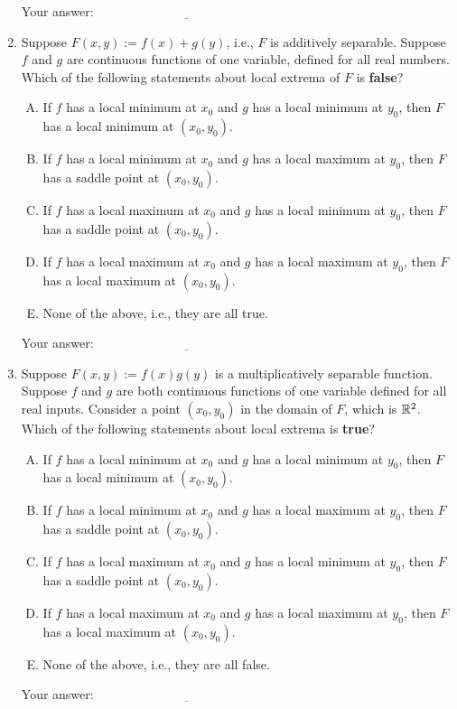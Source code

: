 \documentclass[10pt]{amsart}
\begin{document}
\begin{enumerate}
  \vspace{0.1in}
  Your answer: $\underline{\qquad\qquad\qquad\qquad\qquad\qquad\qquad}$
  \vspace{0.15in}

\item Suppose $F(x,y) := f(x) + g(y)$, i.e., $F$ is additively
  separable. Suppose $f$ and $g$ are continuous functions of one
  variable, defined for all real numbers. Which of the following
  statements about local extrema of $F$ is {\bf false}?

  \begin{enumerate}[(A)]
  \item If $f$ has a local minimum at $x_0$ and $g$ has a local
    minimum at $y_0$, then $F$ has a local minimum at $(x_0,y_0)$.
  \item If $f$ has a local minimum at $x_0$ and $g$ has a local
    maximum at $y_0$, then $F$ has a saddle point at $(x_0,y_0)$.
  \item If $f$ has a local maximum at $x_0$ and $g$ has a local
    minimum at $y_0$, then $F$ has a saddle point at $(x_0,y_0)$.
  \item If $f$ has a local maximum at $x_0$ and $g$ has a local
    maximum at $y_0$, then $F$ has a local maximum at $(x_0,y_0)$.
  \item None of the above, i.e., they are all true.
  \end{enumerate}
  
  \vspace{0.1in}
  Your answer: $\underline{\qquad\qquad\qquad\qquad\qquad\qquad\qquad}$
  \vspace{0.15in}

\item Suppose $F(x,y) := f(x)g(y)$ is a multiplicatively separable
  function. Suppose $f$ and $g$ are both continuous functions of
  one variable defined for all real inputs. Consider a point
  $(x_0,y_0)$ in the domain of $F$, which is $\mathbb{R}^2$. Which of the
  following statements about local extrema is {\bf true}?

  \begin{enumerate}[(A)]
  \item If $f$ has a local minimum at $x_0$ and $g$ has a local
    minimum at $y_0$, then $F$ has a local minimum at $(x_0,y_0)$.
  \item If $f$ has a local minimum at $x_0$ and $g$ has a local
    maximum at $y_0$, then $F$ has a saddle point at $(x_0,y_0)$.
  \item If $f$ has a local maximum at $x_0$ and $g$ has a local
    minimum at $y_0$, then $F$ has a saddle point at $(x_0,y_0)$.
  \item If $f$ has a local maximum at $x_0$ and $g$ has a local
    maximum at $y_0$, then $F$ has a local maximum at $(x_0,y_0)$.
  \item None of the above, i.e., they are all false.
  \end{enumerate}

  \vspace{0.1in}
  Your answer: $\underline{\qquad\qquad\qquad\qquad\qquad\qquad\qquad}$
  \vspace{0.15in}

\end{enumerate}
\end{document}
